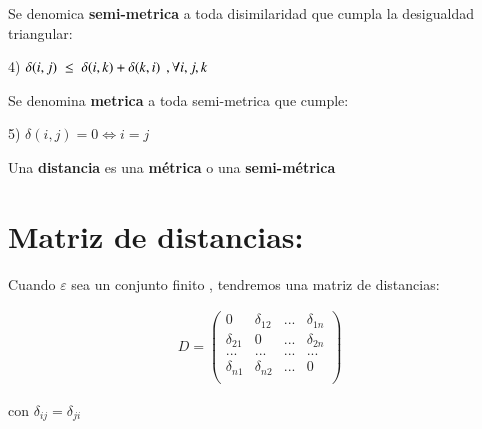 \documentclass[12pt]{report} %
\begin{document}
\begin{tcolorbox}[toptitle=2mm,title= Semi-Métrica:   ]
Se denomica \textbf{semi-metrica} a toda disimilaridad  que cumpla la desigualdad triangular:

4)\hspace{0.2cm} $\delta (i,j) \hspace{0.1 cm}\leq \hspace{0.1 cm} \delta (i,k) + \delta (k,i) \hspace{0.15cm}, \forall i,j,k$

\end{tcolorbox}

\begin{tcolorbox}[toptitle=2mm,title= Métrica:   ]
Se denomina \textbf{metrica} a toda semi-metrica que cumple:

5)\hspace{0.2cm} $\delta (i,j)=0 \Leftrightarrow i=j$
\end{tcolorbox}

\begin{tcolorbox}[toptitle=2mm,title= Distancia:   ]
Una \textbf{distancia} es una \textbf{métrica} o una \textbf{semi-métrica}
 \end{tcolorbox}
 
\newpage

\section{Matriz de distancias:}

Cuando $\varepsilon$ sea un conjunto finito , tendremos una matriz de distancias:
\begin{tcolorbox}[toptitle=2mm,title= Matriz de distancias:   ]
\begin{gather*}
D= \begin{pmatrix}
0 & \delta_{12}&...&\delta_{1n}\\
\delta_{21} & 0&...&\delta_{2n}\\
...&...&...&...\\
\delta_{n1}& \delta_{n2}&...& 0\\
\end{pmatrix}
\end{gather*}

con $\delta_{ij}=\delta_{ji}$

\end{tcolorbox}
\end{document}
